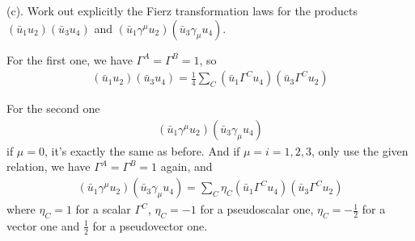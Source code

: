 \documentclass{article}
\begin{document}
(c). Work out explicitly the Fierz transformation laws for the products $(\bar u_1u_2)(\bar u_3u_4)$ and $(\bar u_1\gamma^{\mu}u_2)(\bar u_3\gamma_{\mu}u_4)$.

For the first one, we have $\Gamma^A=\Gamma^B=1$, so
\begin{align*}
  (\bar u_1u_2)(\bar u_3u_4)=\frac{1}{4}\sum_C(\bar u_1\Gamma^Cu_4)(\bar u_3\Gamma^Cu_2)
\end{align*}

For the second one
\begin{align*}
  (\bar u_1\gamma^{\mu}u_2)(\bar u_3\gamma_{\mu}u_4)
\end{align*}
if $\mu=0$, it's exactly the same as before. And if $\mu=i=1,2,3$, only use the given relation, we have $\Gamma^A=\Gamma^B=1$ again, and
\begin{align*}
  (\bar u_1\gamma^{\mu}u_2)(\bar u_3\gamma_{\mu}u_4)=\sum_C\eta_C(\bar u_1\Gamma^Cu_4)(\bar u_3\Gamma^Cu_2)
\end{align*}
where $\eta_C=1$ for a scalar $\Gamma^C$, $\eta_C=-1$ for a pseudoscalar one, $\eta_C=-\frac{1}{2}$ for a vector one and $\frac{1}{2}$ for a pseudovector one.
\end{document}
